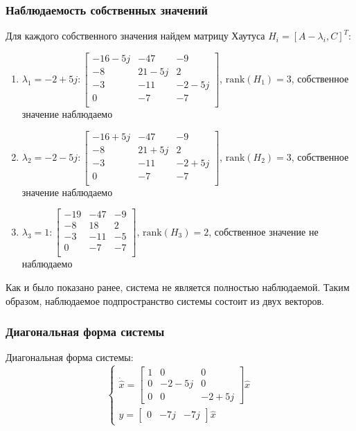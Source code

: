 \subsubsection{Наблюдаемость собственных значений}
Для каждого собственного значения найдем матрицу Хаутуса $H_i = [A - \lambda_i, C]^T$:
\begin{enumerate}
    \item $\lambda_1 = -2 + 5j: \begin{bmatrix}
        -16 - 5j  & -47  & -9 \\ 
        -8  & 21 - 5j  & 2 \\ 
        -3  & -11  & -2 - 5j \\ 
        0  & -7  & -7 \\ 
        \end{bmatrix} $, $\text{rank}(H_1) = 3$, собственное значение наблюдаемо

    \item $\lambda_2 = -2 - 5j: \begin{bmatrix}
        -16 + 5j  & -47  & -9 \\ 
        -8  & 21 + 5j  & 2 \\ 
        -3  & -11  & -2 + 5j \\ 
        0  & -7  & -7 \\ 
    \end{bmatrix}$, $\text{rank}(H_2) = 3$, собственное значение наблюдаемо

    \item $\lambda_3 = 1: \begin{bmatrix}
        -19  & -47  & -9 \\ 
        -8  & 18  & 2 \\ 
        -3  & -11  & -5 \\ 
        0  & -7  & -7 \\ 
    \end{bmatrix}$, $\text{rank}(H_3) = 2$, собственное значение не наблюдаемо
    
\end{enumerate}

Как и было показано ранее, система не является полностью наблюдаемой. Таким образом, наблюдаемое подпространство системы состоит из двух векторов.

\subsubsection{Диагональная форма системы}
Диагональная форма системы:
\begin{equation}
    \begin{cases}
        \dot{\hat{x}} = \begin{bmatrix}
            1 & 0 & 0 \\
            0 & -2-5j & 0 \\
            0 & 0 & -2+5j
        \end{bmatrix} \hat{x} \\ 
        y = \begin{bmatrix}
            0 & -7j & -7j
        \end{bmatrix} \hat{x}
    \end{cases}
\end{equation}

